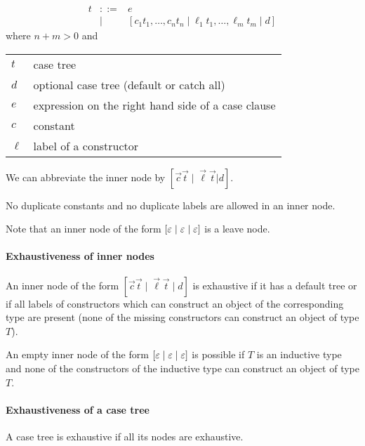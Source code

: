 $$
    \begin{array}{lllll}
        t
        &::=& e
        \\
        &\mid& [
            c_1 t_1, \ldots,  c_n t_n \mid
            \ell_1 t_1, \ldots, \ell_m t_m
            \mid
            d
        ]
    \end{array}
$$
%
where $n + m > 0$ and
%
\begin{center}
    \begin{tabular}{l p{8cm}}
        $t$ & case tree
        \\
        $d$ & optional case tree (default or catch all)
        \\
        $e$ & expression on the right hand side of a case clause
        \\
        $c$ & constant
        \\
        $\ell$ & label of a constructor
    \end{tabular}
\end{center}

We can abbreviate the inner node by $[\vec c\vec t \mid \vec\ell \vec t | d]$.


No duplicate constants and no duplicate labels are allowed in an inner node.

Note that an inner node of the form $[\varepsilon \mid \varepsilon \mid \varepsilon]$ is
a leave node.



\paragraph{Exhaustiveness of inner nodes}
%

An inner node of the form $[\vec c \vec t \mid \vec\ell \vec t \mid d]$ is
exhaustive if it has a default tree or if all labels of constructors which can
construct an object of the corresponding type are present (none of the missing
constructors can construct an object of type $T$).

An empty inner node of the form $[\varepsilon \mid \varepsilon \mid \varepsilon]$ is
possible if $T$ is an inductive type and none of the constructors of the
inductive type can construct an object of type $T$.


\paragraph{Exhaustiveness of a case tree}
%
A case tree is exhaustive if all its nodes are exhaustive.






